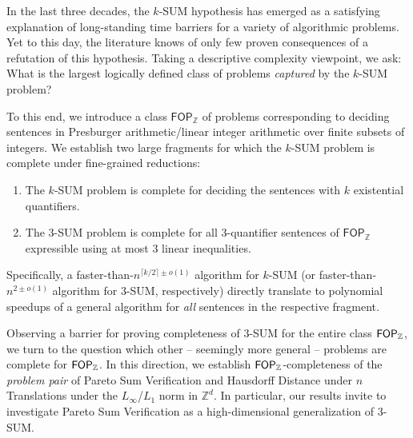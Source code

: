 In the last three decades, the $k$-SUM hypothesis has emerged as a satisfying explanation of long-standing time barriers for a variety of algorithmic problems. Yet to this day, the literature knows of only few proven consequences of a refutation of this hypothesis. Taking a descriptive complexity viewpoint, we ask: What is the largest logically defined class of problems \emph{captured} by the $k$-SUM problem?

	To this end, we introduce a class $\mathsf{FOP}_{\mathbb{Z}}$ of problems corresponding to deciding sentences in Presburger arithmetic/linear integer arithmetic over finite subsets of integers.
	We establish two large fragments for which the $k$-SUM problem is complete under fine-grained reductions:
	\begin{enumerate}
		\item The $k$-SUM problem is complete for deciding the sentences with $k$ existential quantifiers.
		\item The $3$-SUM problem is complete for all $3$-quantifier sentences of $\mathsf{FOP}_{\mathbb{Z}}$ expressible using at most $3$ linear inequalities.
	\end{enumerate}
	Specifically, a faster-than-$n^{\lceil k/2 \rceil \pm o(1)}$ algorithm for $k$-SUM (or faster-than-$n^{2 \pm o(1)}$ algorithm for $3$-SUM, respectively) directly translate to polynomial speedups of a general algorithm for \emph{all} sentences in the respective fragment.
	
	Observing a barrier for proving completeness of $3$-SUM for the entire class $\mathsf{FOP}_{\mathbb{Z}}$, we turn to the question which other -- seemingly more general -- problems are complete for $\mathsf{FOP}_{\mathbb{Z}}$. In this direction, we establish $\mathsf{FOP}_{\mathbb{Z}}$-completeness of the \emph{problem pair} of Pareto Sum Verification and Hausdorff Distance under $n$ Translations under the $L_\infty$/$L_1$ norm in $\mathbb{Z}^d$. In particular, our results invite to investigate Pareto Sum Verification as a high-dimensional generalization of 3-SUM.

	